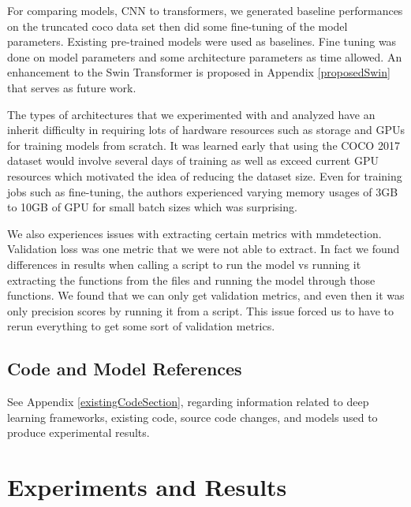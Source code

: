\documentclass[10pt,twocolumn,letterpaper]{article}
\begin{document}
For comparing models, CNN to transformers, we generated baseline performances on the truncated coco data set then did some fine-tuning of the model parameters. Existing pre-trained models were used as baselines. Fine tuning was done on model parameters and some architecture parameters as time allowed. An enhancement to the Swin Transformer is proposed in Appendix \ref{proposedSwin} that serves as future work.


The types of architectures that we experimented with and analyzed have an inherit difficulty in requiring lots of hardware resources such as storage and GPUs for training models from scratch. It was learned early that using the COCO 2017 dataset would involve several days of training as well as exceed current GPU resources which motivated the idea of reducing the dataset size. Even for training jobs such as fine-tuning, the authors experienced varying memory usages of 3GB to 10GB of GPU for small batch sizes which was surprising.

We also experiences issues with extracting certain metrics with mmdetection. Validation loss was one metric that we were not able to extract. In fact we found differences in results when calling a script to run the model vs running it extracting the functions from the files and running the model through those functions. We found that we can only get validation metrics, and even then it was only precision scores by running it from a script. This issue forced us to have to rerun everything to get some sort of validation metrics.   


\subsection{Code and Model References}

See Appendix \ref{existingCodeSection}, regarding information related to deep learning frameworks, existing code, source code changes, and models used to produce experimental results.

\section{Experiments and Results}
\end{document}
